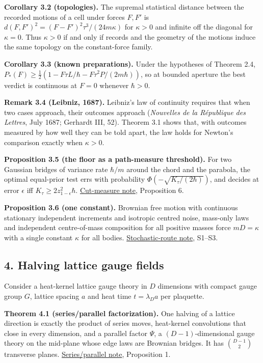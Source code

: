 \documentclass[11pt,a4paper]{article}
\begin{document}
\textbf{Corollary 3.2 (topologies).} The supremal statistical distance
between the recorded motions of a cell under forces \(F,F'\) is
\(d(F,F')^2=(F-F')^2\tau^3/(24m\kappa)\) for \(\kappa>0\) and infinite
off the diagonal for \(\kappa=0\). Thus \(\kappa>0\) if and only if
records and the geometry of the motions induce the same topology on the
constant-force family.

\textbf{Corollary 3.3 (known preparations).} Under the hypotheses of
Theorem 2.4, \(P_*(F)\ge\frac12(1-F\tau L/\hbar-F\tau^2P/(2m\hbar))\),
so at bounded aperture the best verdict is continuous at \(F=0\)
whenever \(\hbar>0\).

\textbf{Remark 3.4 (Leibniz, 1687).} Leibniz's law of continuity
requires that when two cases approach, their outcomes approach
(\emph{Nouvelles de la République des Lettres}, July 1687; Gerhardt III,
52). Theorem 3.1 shows that, with outcomes measured by how well they can
be told apart, the law holds for Newton's comparison exactly when
\(\kappa>0\).

\textbf{Proposition 3.5 (the floor as a path-measure threshold).} For
two Gaussian bridges of variance rate \(\hbar/m\) around the chord and
the parabola, the optimal equal-prior test errs with probability
\(\Phi(-\sqrt{K_\tau/(2\hbar)})\), and decides at error \(\epsilon\) iff
\(K_\tau\ge2z_{1-\epsilon}^2\hbar\).
\href{cut-measure-newton.md}{Cut-measure note}, Proposition 6.

\textbf{Proposition 3.6 (one constant).} Brownian free motion with
continuous stationary independent increments and isotropic centred
noise, mass-only laws and independent centre-of-mass composition for all
positive masses force \(mD=\kappa\) with a single constant \(\kappa\)
for all bodies.
\href{stochastic-route-velocitas-ultima.md}{Stochastic-route note},
S1--S3.

\hypertarget{halving-lattice-gauge-fields}{%
\subsection{4. Halving lattice gauge
fields}\label{halving-lattice-gauge-fields}}

Consider a heat-kernel lattice gauge theory in \(D\) dimensions with
compact gauge group \(G\), lattice spacing \(a\) and heat time
\(t=\lambda_Da\) per plaquette.

\textbf{Theorem 4.1 (series/parallel factorization).} One halving of a
lattice direction is exactly the product of series moves, heat-kernel
convolutions that close in every dimension, and a parallel factor
\(\Psi\), a \((D-1)\)-dimensional gauge theory on the mid-plane whose
edge laws are Brownian bridges. It has \(\binom{D-1}2\) transverse
planes. \href{series-parallel-gauge-refinement.md}{Series/parallel
note}, Proposition 1.
\end{document}
